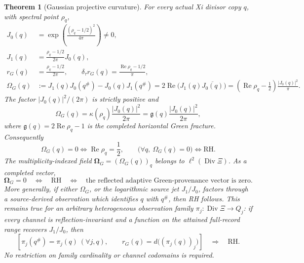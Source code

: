 \documentclass[11pt]{article}
\newtheorem{theorem}{Theorem}[section]
\theoremstyle{definition}
\theoremstyle{remark}
\newcommand{\Rea}{\operatorname{Re}}
\newcommand{\Div}{\operatorname{Div}}
\begin{document}
\begin{theorem}[Gaussian projective curvature]
\label{thm:gaussian-projective-curvature}
For every actual Xi divisor copy \(q\), with spectral point \(\rho_q\),
\begin{align}
 J_0(q)&=\exp\!\left(\frac{(\rho_q-1/2)^2}{4\pi}\right)\ne0,
 \tag{7.6B}\label{eq:gaussian-zero-jet}\\
 J_1(q)&=\frac{\rho_q-1/2}{2\pi}J_0(q),
 \tag{7.6C}\label{eq:gaussian-first-jet}\\
 r_G(q)&=\frac{\rho_q-1/2}{2\pi},
 \qquad
 \delta_\tau r_G(q)=\frac{\Rea\rho_q-1/2}{\pi},
 \tag{7.6C1}\label{eq:gaussian-universal-descent-defect}\\
 \Omega_G(q)&:=J_1(q)J_0(q^\#)-J_0(q)J_1(q^\#)
   =2\Rea\!\bigl(J_1(q)\overline{J_0(q)}\bigr)
   =\left(\Rea\rho_q-\frac12\right)\frac{|J_0(q)|^2}{\pi}.
 \tag{7.6D}\label{eq:gaussian-wronskian-orientation}
\end{align}
The factor \(|J_0(q)|^2/(2\pi)\) is strictly positive and
\[
 \Omega_G(q)=\kappa(\rho_q)\frac{|J_0(q)|^2}{2\pi}
             =\mathfrak g(q)\frac{|J_0(q)|^2}{2\pi},
\tag{7.6E}\label{eq:gaussian-green-coupling}
\]
where \(\mathfrak g(q)=2\Rea\rho_q-1\) is the completed horizontal Green
fracture.  Consequently
\[
 \Omega_G(q)=0\Longleftrightarrow\Rea\rho_q=\frac12,
 \qquad
 \bigl(\forall q,\ \Omega_G(q)=0\bigr)
     \Longleftrightarrow\mathrm{RH}.
\tag{7.6F}\label{eq:gaussian-wronskian-rh}
\]
The multiplicity-indexed field
\(\boldsymbol\Omega_G=(\Omega_G(q))_q\) belongs to
\(\ell^2(\Div\Xi)\).  As a completed vector,
\[
 \boldsymbol\Omega_G=0
 \quad\Longleftrightarrow\quad\mathrm{RH}
 \quad\Longleftrightarrow\quad
 \text{the reflected adaptive Green-provenance vector is zero}.
\tag{7.6G}\label{eq:gaussian-wronskian-field}
\]
More generally, if either \(\Omega_G\), or the logarithmic source jet
\(J_1/J_0\), factors through a source-derived observation which identifies
\(q\) with \(q^\#\), then RH follows.
This remains true for an arbitrary heterogeneous observation family
\(\pi_j:\Div\Xi\to Q_j\): if every channel is reflection-invariant and a
function on the attained full-record range recovers \(J_1/J_0\), then
\[
 \left[
   \pi_j(q^\#)=\pi_j(q)\ (\forall j,q),\qquad
   r_G(q)=d\bigl((\pi_j(q))_j\bigr)
 \right]
 \quad\Longrightarrow\quad \mathrm{RH}.
\tag{7.6H}\label{eq:gaussian-invariant-family-rh}
\]
No restriction on family cardinality or channel codomains is required.
\end{theorem}
\end{document}
